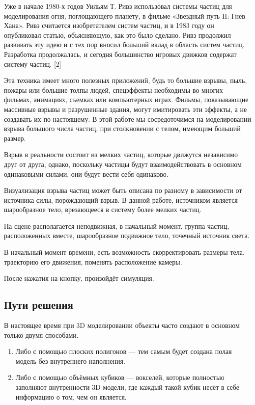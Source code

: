 \documentclass[a4paper,14pt]{article} %
\begin{document}
	Уже в начале 1980-х годов Уильям Т. Ривз использовал системы частиц для моделирования огня, поглощающего планету, в фильме «Звездный путь II: Гнев Хана». Ривз считается изобретателем систем частиц, и в 1983 году он опубликовал статью, объясняющую, как это было сделано. Ривз продолжил развивать эту идею и с тех пор вносил больший вклад в область систем частиц. Разработка продолжалась, и сегодня большинство игровых движков содержат систему частиц. [2]
	
	Эта техника имеет много полезных приложений, будь то большие взрывы, пыль, пожары или большие толпы людей, спецэффекты необходимы во многих фильмах, анимациях, съемках или компьютерных играх. Фильмы, показывающие массивные взрывы и разрушенные здания, могут имитировать эти эффекты, а не создавать их по-настоящему. В этой работе мы сосредоточимся на моделировании взрыва большого числа частиц, при столкновении с телом, имеющим больший размер.
	
	Взрыв в реальности состоит из мелких частиц, которые движутся независимо друг от друга, однако, поскольку частицы будут взаимодействовать в основном одинаковыми силами, они будут вести себя одинаково.
	
	Визуализация взрыва частиц может быть описана по разному в зависимости от источника силы, порождающий взрыв. В данной работе, источником является шарообразное тело, врезающееся в систему более мелких частиц.
	
	На сцене располагается неподвижная, в начальный момент, группа частиц, расположенных вместе, шарообразное подвижное тело, точечный источник света.
	
	В начальный момент времени, есть возможность скорректировать размеры тела, траекторию его движения, поменять расположение камеры.
	
	После нажатия на кнопку, произойдёт симуляция.
	
	\subsection{Пути решения}
	\hfill
	
	В настоящее время при 3D моделировании объекты часто создают в основном только двумя способами. 
	\begin{enumerate}
	\item Либо с помощью плоских полигонов — тем самым будет создана полая модель без внутреннего наполнения. 
	\item Либо с помощью объёмных кубиков — вокселей, которые полностью заполняют внутренности 3D модели, где каждый такой кубик несёт в себе информацию о том, чем он является.
	\end{enumerate}
\end{document}
